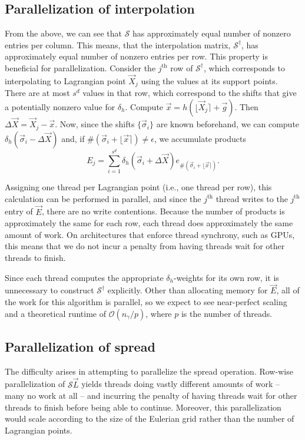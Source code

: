 \subsection{Parallelization of interpolation}
From the above, we can see that $\mathcal{S}$ has approximately equal number
of nonzero entries per column. This means, that the interpolation matrix,
$\mathcal{S}^\dagger$, has approximately equal number of nonzero entries per row.
This property is beneficial for parallelization. Consider the $j^\text{th}$ row of
$\mathcal{S}^\dagger$, which corresponds to interpolating to Lagrangian point
$\vec{X}_j$ using the values at its support points. There are at most $s^d$
values in that row, which correspond to the shifts that give a potentially
nonzero value for $\delta_h$. Compute $\vec{x} = h(\lfloor\vec{X}_j\rceil+\vec{g})$.
Then $\Delta\vec{X} = \vec{X}_j-\vec{x}$. Now, since the shifts $\{\vec{\sigma}_i\}$
are known beforehand, we can compute $\delta_h(\vec{\sigma}_i-\Delta\vec{X})$
and, if $\#(\vec{\sigma}_i+\lfloor\vec{x}\rceil) \neq\epsilon$, we accumulate
products
\begin{equation*}
    E_j = \sum_{i=1}^{s^d}\delta_h(\vec{\sigma}_i+\Delta\vec{X})e_{\#(\vec{\sigma}_i+\lfloor\vec{x}\rceil)}.
\end{equation*}

Assigning one thread per Lagrangian point (i.e., one thread per row), this
calculation can be performed in parallel, and since the $j^\text{th}$ thread writes
to the $j^\text{th}$ entry of $\vec{E}$, there are no write contentions. Because the
number of products is approximately the same for each row, each thread does
approximately the same amount of work. On architectures that enforce thread
synchrony, such as GPUs, this means that we do not incur a penalty from having
threads wait for other threads to finish.

Since each thread computes the appropriate $\delta_h$-weights for its own row,
it is unnecessary to construct $\mathcal{S}^\dagger$ explicitly. Other than
allocating memory for $\vec{E}$, all of the work for this algorithm is parallel,
so we expect to see near-perfect scaling and a theoretical runtime of
$\mathcal{O}(n_\gamma/p)$, where $p$ is the number of threads.

\subsection{Parallelization of spread}
The difficulty arises in attempting to parallelize the spread operation.
Row-wise parallelization of $\mathcal{S}\vec{L}$ yields threads doing vastly
different amounts of work -- many no work at all -- and incurring the penalty
of having threads wait for other threads to finish before being able to
continue. Moreover, this parallelization would scale according to the size of
the Eulerian grid rather than the number of Lagrangian points.

